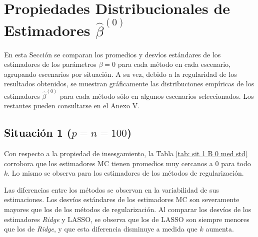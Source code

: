 \documentclass[a4paper,12pt]{report}
\begin{document}
\section{Propiedades Distribucionales de Estimadores $\hat{\beta}^{(0)}$}
En esta Sección se comparan los promedios y desvíos estándares de los estimadores de los parámetros $\beta=0$ para cada método en cada escenario, agrupando escenarios por situación. A su vez, debido a la regularidad de los resultados obtenidos, se muestran gráficamente las distribuciones empíricas de los estimadores $\hat{\beta}^{(0)}$ para cada método sólo en algunos escenarios seleccionados. Los restantes pueden consultarse en el Anexo V.

\subsection*{Situación 1 ($p=n=100$)}
Con respecto a la propiedad de insesgamiento, la Tabla \ref{tab: sit 1 B 0 med std} corrobora que los estimadores MC tienen promedios muy cercanos a 0 para todo $k$. Lo mismo se observa para los estimadores de los métodos de regularización.

Las diferencias entre los métodos se observan en la variabilidad de sus estimaciones. Los desvíos estándares de los estimadores MC son severamente mayores que los de los métodos de regularización. Al comparar los desvíos de los estimadores \textit{Ridge} y LASSO, se observa que los de LASSO son siempre menores que los de \textit{Ridge}, y que esta diferencia disminuye a medida que $k$ aumenta.
\end{document}
